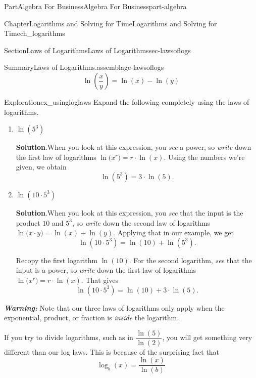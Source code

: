 \documentclass{tufte-book}
\newcommand{\blocktitlefont}{\relax}
\newcommand{\alert}[1]{\textbf{\textit{#1}}}
\numberwithin{equation}{chapter}
\begin{document}
\begin{partptx}{Part}{Algebra For Business}{}{Algebra For Business}{}{}{part-algebra}
\begin{chapterptx}{Chapter}{Logarithms and Solving for Time}{}{Logarithms and Solving for Time}{}{}{ch_logarithms}
\begin{sectionptx}{Section}{Laws of Logarithms}{}{Laws of Logarithms}{}{}{sec-lawsoflogs}
\begin{assemblage}{Summary}{Laws of Logarithms.}{assemblage-lawsoflogs}
%
\begin{equation*}
\ln\left( \dfrac{x}{y} \right)= \ln(x) - \ln(y)
\end{equation*}
%
\end{assemblage}
\begin{exploration}{Exploration}{}{ex_usingloglaws}%
Expand the following completely using the laws of logarithms.%
\begin{enumerate}[font=\bfseries,label=(\alph*),ref=\alph*]%
\item{}\(\ln(5^3)\)%
\par\smallskip%
\noindent\textbf{\blocktitlefont Solution}.\hypertarget{ex_usingloglaws-2-2}{}\quad{}When you look at this expression, you \emph{see} a power, so \emph{write} down the first law of logarithms \(\ln\Big( x^r \Big)= r\cdot \ln(x)\).  Using the numbers we're given, we obtain%
\begin{equation*}
\ln(5^3) = 3\cdot \ln(5)\text{.}
\end{equation*}
%
\item{}\(\ln(10\cdot 5^3) \)%
\par\smallskip%
\noindent\textbf{\blocktitlefont Solution}.\hypertarget{ex_usingloglaws-3-2}{}\quad{}When you look at this expression, you \emph{see} that the input is the product \(10\) and \(5^3\), so \emph{write} down the second law of logarithms \(\ln\Big( x\cdot y \Big)= \ln(x) + \ln(y)\).   Applying that in our example, we get%
\begin{equation*}
\ln(10\cdot 5^3) = \ln(10) + \ln( 5^3 )\text{.}
\end{equation*}
%
\par
Recopy the first logarithm \(\ln(10)\). For the second logarithm, \emph{see} that the input is a power, so \emph{write} down the first law of logarithms \(\ln\Big( x^r \Big)= r\cdot \ln(x)\).  That gives%
\begin{equation*}
\ln(10\cdot 5^3) = \ln(10) + 3\cdot \ln( 5 )\text{.}
\end{equation*}
%
\end{enumerate}%
\end{exploration}%
\alert{Warning:} Note that our three laws of logarithms only apply when the exponential, product, or fraction is \emph{inside} the logarithm.%
\par
If you try to divide logarithms, such as in \(\dfrac{\ln(5)}{\ln(2)}\), you will get something very different than our log laws. This is because of the surprising fact that%
\begin{equation*}
\log_b(x) = \dfrac{\ln(x)}{\ln(b)}

\end{equation*}
\end{sectionptx}
\end{chapterptx}
\end{partptx}
\end{document}
